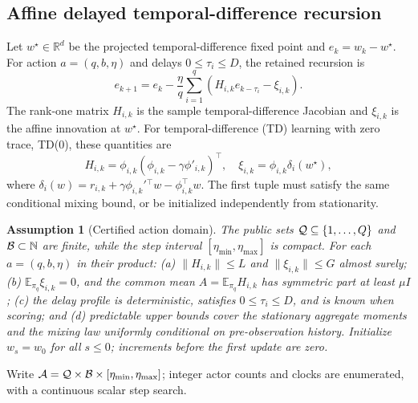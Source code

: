 \documentclass[journal]{IEEEtran}
\newtheorem{assumption}{Assumption}
\newcommand{\E}{\mathbb{E}}
\newcommand{\R}{\mathbb{R}}
\newcommand{\A}{\mathcal{A}}
\begin{document}
\subsection{Affine delayed temporal-difference recursion}
Let $w^\star\in\R^d$ be the projected temporal-difference fixed point and $e_k=w_k-w^\star$.
For action $a=(q,b,\eta)$ and delays $0\le\tau_i\le D$, the retained recursion is
\begin{equation}
e_{k+1}=e_k-\frac{\eta}{q}\sum_{i=1}^{q}\left(H_{i,k}e_{k-\tau_i}-\xi_{i,k}\right).
\label{eq:affine-td}
\end{equation}
The rank-one matrix $H_{i,k}$ is the sample temporal-difference Jacobian and $\xi_{i,k}$ is the affine innovation at $w^\star$.
For temporal-difference (TD) learning with zero trace, TD(0), these quantities are
\begin{equation}
H_{i,k}=\phi_{i,k}(\phi_{i,k}-\gamma\phi'_{i,k})^\top,
\quad
\xi_{i,k}=\phi_{i,k}\delta_i(w^\star),
\label{eq:td-components}
\end{equation}
where $\delta_i(w)=r_{i,k}+\gamma\phi_{i,k}'{}^\top w-\phi_{i,k}^\top w$.
The first tuple must satisfy the same conditional mixing bound, or be initialized independently from stationarity.

\begin{assumption}[Certified action domain]
The public sets ${\cal Q}\subseteq\{1,\ldots,Q\}$ and ${\cal B}\subset\mathbb N$ are finite, while the step interval $[\eta_{\min},\eta_{\max}]$ is compact.
For each $a=(q,b,\eta)$ in their product: (a) $\|H_{i,k}\|\le L$ and $\|\xi_{i,k}\|\le G$ almost surely; (b) $\E_{\pi_q}\xi_{i,k}=0$, and the common mean $A=\E_{\pi_q}H_{i,k}$ has symmetric part at least $\mu I$; (c) the delay profile is deterministic, satisfies $0\le\tau_i\le D$, and is known when scoring; and (d) predictable upper bounds cover the stationary aggregate moments and the mixing law uniformly conditional on pre-observation history.
Initialize $w_s=w_0$ for all $s\le0$; increments before the first update are zero.
\label{ass:catalogue}
\end{assumption}

Write $\A={\cal Q}\times{\cal B}\times[\eta_{\min},\eta_{\max}]$; integer actor counts and clocks are enumerated, with a continuous scalar step search.
\end{document}
